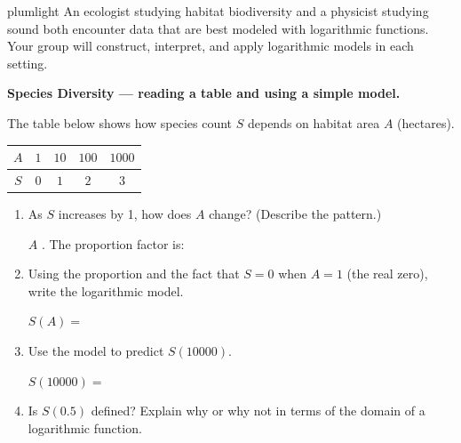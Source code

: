 \documentclass[10pt]{article}
\begin{document}
\namepartnerperiod

\vspace{0.1in}

\begin{scenariobox}{plumlight}
An ecologist studying habitat biodiversity and a physicist studying sound both encounter
data that are best modeled with logarithmic functions. Your group will construct, interpret,
and apply logarithmic models in each setting.
\end{scenariobox}

\vspace{0.1in}

\begin{tcolorbox}[colback=white, colframe=black!40,
    title=\textbf{Tier R --- Remediate},
    fonttitle=\bfseries, arc=2mm, left=3mm, right=3mm, top=2mm, bottom=2mm]

\textbf{Species Diversity --- reading a table and using a simple model.}

\vspace{4pt}
The table below shows how species count $S$ depends on habitat area $A$ (hectares).

\vspace{4pt}
\begin{center}
\renewcommand{\arraystretch}{1.8}
\begin{tabular}{|c|c|c|c|c|}
\hline
\rowcolor{sky}
$A$ & $1$ & $10$ & $100$ & $1000$ \\
\hline
$S$ & $0$ & $1$  & $2$   & $3$ \\
\hline
\end{tabular}
\end{center}

\begin{enumerate}[leftmargin=1.8em, itemsep=10pt]

\item As $S$ increases by 1, how does $A$ change? (Describe the pattern.)

\vspace{4pt}
$A$ \blank{5cm}. The proportion factor is: \blank{1.5cm}

\item Using the proportion and the fact that $S = 0$ when $A = 1$ (the real zero), write
      the logarithmic model.

\vspace{4pt}
$S(A) = $ \blank{4cm}

\item Use the model to predict $S(10000)$.

\vspace{4pt}
$S(10000) = $ \blank{5cm}

\item Is $S(0.5)$ defined? Explain why or why not in terms of the domain of a
      logarithmic function.


\end{enumerate}
\end{tcolorbox}
\end{document}
